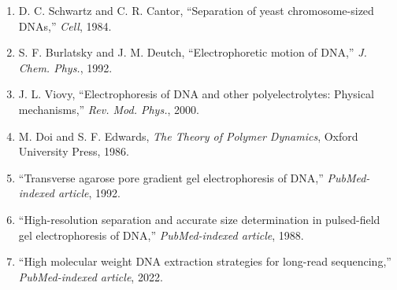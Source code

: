 \documentclass[twocolumn,11pt,a4paper]{article}
\begin{document}
\begin{enumerate}
\item D. C. Schwartz and C. R. Cantor, ``Separation of yeast chromosome-sized DNAs,'' \textit{Cell}, 1984.
\item S. F. Burlatsky and J. M. Deutch, ``Electrophoretic motion of DNA,'' \textit{J. Chem. Phys.}, 1992.
\item J. L. Viovy, ``Electrophoresis of DNA and other polyelectrolytes: Physical mechanisms,'' \textit{Rev. Mod. Phys.}, 2000.
\item M. Doi and S. F. Edwards, \textit{The Theory of Polymer Dynamics}, Oxford University Press, 1986.
\item ``Transverse agarose pore gradient gel electrophoresis of DNA,'' \textit{PubMed-indexed article}, 1992.
\item ``High-resolution separation and accurate size determination in pulsed-field gel electrophoresis of DNA,'' \textit{PubMed-indexed article}, 1988.
\item ``High molecular weight DNA extraction strategies for long-read sequencing,'' \textit{PubMed-indexed article}, 2022.
\end{enumerate}
\end{document}
